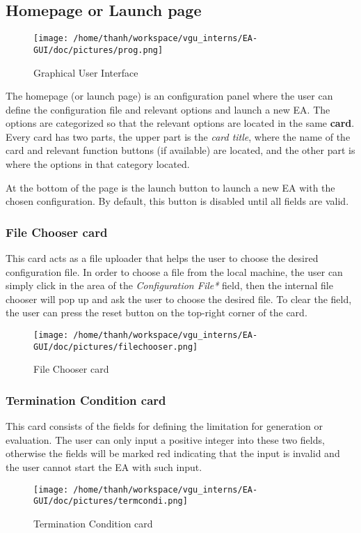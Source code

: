 \documentclass[11pt,a4paper]{article}
\begin{document}
\subsection{Homepage or Launch page}
\begin{figure}[htp]
\centering
\texttt{[image: /home/thanh/workspace/vgu\_interns/EA-GUI/doc/pictures/prog.png]}
\caption{Graphical User Interface}
\label{}
\end{figure}
The homepage (or launch page) is an configuration panel where the user can define the configuration file and relevant options and launch a new EA. The options are categorized so that the relevant options are located in the same \textbf{card}. Every card has two parts, the upper part is the \textit{card title}, where the name of the card and relevant function buttons (if available) are located, and the other part is where the options in that category located.

At the bottom of the page is the launch button to launch a new EA with the chosen configuration. By default, this button is disabled until all fields are valid. 

\subsubsection{File Chooser card}
This card acts as a file uploader that helps the user to choose the desired configuration file. In order to choose a file from the local machine, the user can simply click in the area of the \textit{Configuration File*} field, then the internal file chooser will pop up and ask the user to choose the desired file. To clear the field, the user can press the reset button on the top-right corner of the card. 
\begin{figure}[htp]
\centering
\texttt{[image: /home/thanh/workspace/vgu\_interns/EA-GUI/doc/pictures/filechooser.png]}
\caption{File Chooser card}
\label{}
\end{figure}

\subsubsection{Termination Condition card}
This card consists of the fields for defining the limitation for generation or evaluation. The user can only input a positive integer into these two fields, otherwise the fields will be marked red indicating that the input is invalid and the user cannot start the EA with such input. 
\begin{figure}[htp]
\centering
\texttt{[image: /home/thanh/workspace/vgu\_interns/EA-GUI/doc/pictures/termcondi.png]}
\caption{Termination Condition card}
\label{}
\end{figure}
\end{document}
